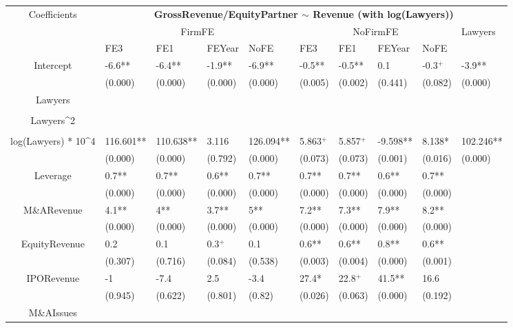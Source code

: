 \documentclass{article}
\begin{document}
\begin{table}[H]
\centering
\begin{tabular}{|clllllllll|}
\hline
\multirow{3}{*}{Coefficients} & \multicolumn{9}{c|}{\textbf{GrossRevenue/EquityPartner $\sim$ Revenue (with log(Lawyers))}} \\
\cline{2-10}
& \multicolumn{4}{c}{FirmFE} & \multicolumn{4}{c}{NoFirmFE} & \multirow{2}{*}{Lawyers} \\
\cline{2-9}
& FE3 & FE1 & FEYear & NoFE & FE3 & FE1 & FEYear & NoFE &  \\
\hline
 
Intercept & -6.6** & -6.4** & -1.9** & -6.9** & -0.5** & -0.5** & 0.1 & -0.3$^{+}$ & -3.9** \\ 
   & (0.000) & (0.000) & (0.000) & (0.000) & (0.005) & (0.002) & (0.441) & (0.082) & (0.000) \\ 
  Lawyers &  &  &  &  &  &  &  &  &  \\ 
   &  &  &  &  &  &  &  &  &  \\ 
  Lawyers^2 &  &  &  &  &  &  &  &  &  \\ 
   &  &  &  &  &  &  &  &  &  \\ 
  log(Lawyers) * 10^4 & 116.601** & 110.638** & 3.116 & 126.094** & 5.863$^{+}$ & 5.857$^{+}$ & -9.598** & 8.138* & 102.246** \\ 
   & (0.000) & (0.000) & (0.792) & (0.000) & (0.073) & (0.073) & (0.001) & (0.016) & (0.000) \\ 
  Leverage & 0.7** & 0.7** & 0.6** & 0.7** & 0.7** & 0.7** & 0.6** & 0.7** &  \\ 
   & (0.000) & (0.000) & (0.000) & (0.000) & (0.000) & (0.000) & (0.000) & (0.000) &  \\ 
  M\&ARevenue & 4.1** & 4** & 3.7** & 5** & 7.2** & 7.3** & 7.9** & 8.2** &  \\ 
   & (0.000) & (0.000) & (0.000) & (0.000) & (0.000) & (0.000) & (0.000) & (0.000) &  \\ 
  EquityRevenue & 0.2 & 0.1 & 0.3$^{+}$ & 0.1 & 0.6** & 0.6** & 0.8** & 0.6** &  \\ 
   & (0.307) & (0.716) & (0.084) & (0.538) & (0.003) & (0.004) & (0.000) & (0.001) &  \\ 
  IPORevenue & -1 & -7.4 & 2.5 & -3.4 & 27.4* & 22.8$^{+}$ & 41.5** & 16.6 &  \\ 
   & (0.945) & (0.622) & (0.801) & (0.82) & (0.026) & (0.063) & (0.000) & (0.192) &  \\ 
  M\&AIssues &  &  &  &  &  &  &  &  &  \\ 

\end{tabular}
\end{table}
\end{document}
